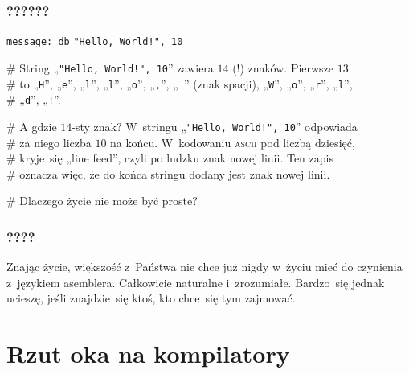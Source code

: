 \documentclass[10pt,t]{beamer}
\begin{document}
\begin{frame}
  \frametitle{??????}


  \texttt{message: db} \hphantom{aaaaa} \texttt{"Hello, World!", 10}

  \# String „\texttt{"Hello, World!", 10}” zawiera $14$ (!) znaków.
  Pierwsze $13$ \\
  \# to „\texttt{H}”, „\texttt{e}”, „\texttt{l}”, „\texttt{l}”,
  „\texttt{o}”, „\texttt{,}”, „\texttt{ }” (znak spacji), „\texttt{W}”,
  „\texttt{o}”, „\texttt{r}”, „\texttt{l}”, \\
  \# „\texttt{d}”, „\texttt{!}”.

  \# A gdzie $14$-sty znak? W~stringu „\texttt{"Hello, World!", 10}”
  odpowiada \\
  \# za niego liczba $10$ na końcu. W~kodowaniu \textsc{ascii} pod liczbą
  dziesięć, \\
  \# kryje~się „line feed”, czyli po ludzku znak nowej linii. Ten zapis \\
  \# oznacza więc, że do końca stringu dodany jest znak nowej linii.

  \# Dlaczego życie nie może być proste?

\end{frame}





\begin{frame}
  \frametitle{????}


  Znając życie, większość z~Państwa nie chce już nigdy w~życiu mieć
  do czynienia z~językiem asemblera. Całkowicie naturalne i~zrozumiałe.
  Bardzo~się jednak ucieszę, jeśli znajdzie~się ktoś, kto chce~się
  tym zajmować.

\end{frame}










\section{Rzut oka na kompilatory}
\end{document}

